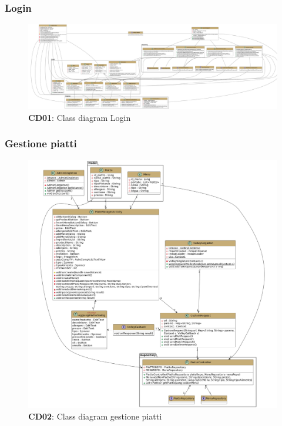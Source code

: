     \subsubsection{Login}
        \begin{figure}[H]
            \centering
            \includegraphics[scale=0.12]{assets/diagrammi/Class diagram di design/ClassDiagram_Login.png}
            \caption*{\textbf{CD01}: Class diagram Login}\label{fig:ClassDiagram_Login}
        \end{figure}
    
    \subsubsection{Gestione piatti}
        \begin{figure}[H]
            \centering
            \includegraphics[scale=0.25]{assets/diagrammi/Class diagram di design/gestione piatti.png}
            \caption*{\textbf{CD02}: Class diagram gestione piatti}\label{fig:ClassDiagram_ManagePlates}
        \end{figure}

